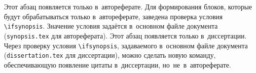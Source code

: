 

\ifsynopsis
Этот абзац появляется только в~автореферате.
Для формирования блоков, которые будут обрабатываться только в~автореферате,
заведена проверка условия \verb!\!\verb!ifsynopsis!.
Значение условия задаётся в~основном файле документа (\verb!synopsis.tex! для
автореферата).
\else
Этот абзац появляется только в~диссертации.
Через проверку условия \verb!\!\verb!ifsynopsis!, задаваемого в~основном файле
документа (\verb!dissertation.tex! для диссертации), можно сделать новую
команду, обеспечивающую появление цитаты в~диссертации, но~не~в~автореферате.
\fi

